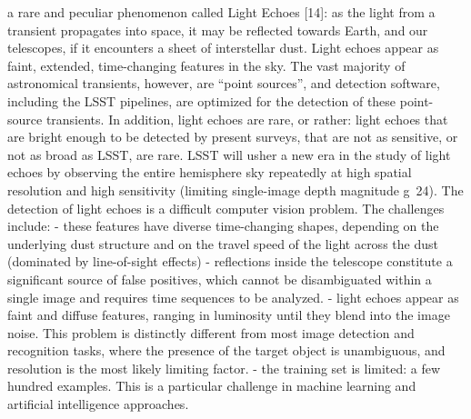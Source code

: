 \documentclass{proposalnsf}
\begin{document}
a rare and peculiar phenomenon called Light Echoes [14]: as the light from a transient propagates into space, it may be reflected towards Earth, and our telescopes, if it encounters a sheet of interstellar dust.  Light echoes appear as faint, extended, time-changing features in the sky.  The vast majority of astronomical transients, however, are “point sources”, and detection software, including the LSST pipelines, are optimized for the detection of these point-source transients. 
In addition, light echoes are rare, or rather: light echoes that are bright enough to be detected by present surveys, that are not as sensitive, or not as broad as LSST, are rare. LSST will usher a new era in the study of light echoes by observing the entire hemisphere sky repeatedly at high spatial resolution and high sensitivity (limiting single-image depth magnitude g~24). 
The detection of light echoes is a difficult computer vision problem.  The challenges include:
- these features have diverse time-changing shapes, depending on the underlying dust structure and on the travel speed of the light across the dust (dominated by line-of-sight effects)
- reflections inside the telescope constitute a significant source of false positives, which cannot be disambiguated within a single image and requires time sequences to be analyzed.
- light echoes appear as faint and diffuse features, ranging in luminosity until they blend into the image noise.  This problem is distinctly different from most image detection and recognition tasks, where the presence of the target object is unambiguous, and resolution is the most likely limiting factor.  
- the training set is limited: a few hundred examples.  This is a particular challenge in machine learning and artificial intelligence approaches. 
\end{document}
